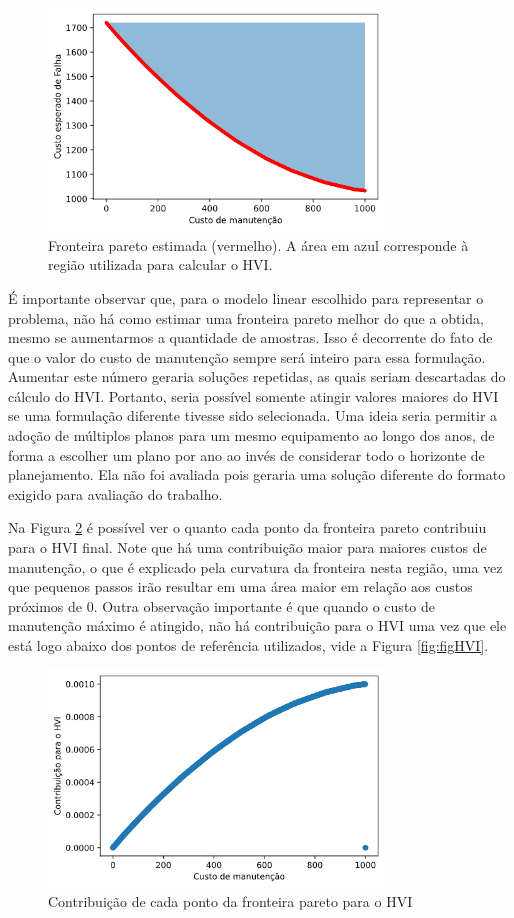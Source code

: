 \documentclass[conference]{IEEEtran}
\begin{document}
\begin{figure}[h!]
	\centering
	\includegraphics[width=3.5in]{pareto_final_hviarea.png}
	\caption{Fronteira pareto estimada (vermelho). A área em azul corresponde à região utilizada para calcular o HVI.}
	\label{fig:pareto_final}
\end{figure}

É importante observar que, para o modelo linear escolhido para representar o problema, não há como estimar uma fronteira pareto melhor do que a obtida, mesmo se aumentarmos a quantidade de amostras. Isso é decorrente do fato de que o valor do custo de manutenção sempre será inteiro para essa formulação. Aumentar este número geraria soluções repetidas, as quais seriam descartadas do cálculo do HVI. Portanto, seria possível somente atingir valores maiores do HVI se uma formulação diferente tivesse sido selecionada. Uma ideia seria permitir a adoção de múltiplos planos para um mesmo equipamento ao longo dos anos, de forma a escolher um plano por ano ao invés de considerar todo o horizonte de planejamento. Ela não foi avaliada pois geraria uma solução diferente do formato exigido para avaliação do trabalho.

Na Figura \ref{fig:pareto_areas} é possível ver o quanto cada ponto da fronteira pareto contribuiu para o HVI final. Note que há uma contribuição maior para maiores custos de manutenção, o que é explicado pela curvatura da fronteira nesta região, uma vez que pequenos passos irão resultar em uma área maior em relação aos custos próximos de 0. Outra observação importante é que quando o custo de manutenção máximo é atingido, não há contribuição para o HVI uma vez que ele está logo abaixo dos pontos de referência utilizados, vide a Figura \ref{fig:figHVI}. 

\begin{figure}[h!]
	\centering
	\includegraphics[width=3.5in]{pareto_areas.png}
	\caption{Contribuição de cada ponto da fronteira pareto para o HVI}
	\label{fig:pareto_areas}
\end{figure}
\end{document}

